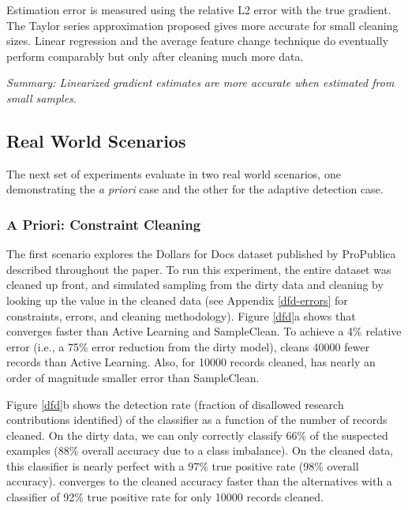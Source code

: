 Estimation error is measured using the relative L2 error with the true gradient.
The Taylor series approximation proposed gives more accurate for small cleaning sizes.
Linear regression and the average feature change technique do eventually perform comparably but only after cleaning much more data.

\vspace{0.25em}

\noindent \emph{Summary: Linearized gradient estimates are more accurate when estimated from small samples. }

\subsection{Real World Scenarios}
The next set of experiments evaluate \sys in two real world scenarios, one demonstrating the \emph{a priori} case and the other for the adaptive detection case.

\subsubsection{A Priori: Constraint Cleaning}\label{dfd-exp}
The first scenario explores the Dollars for Docs dataset published by ProPublica described throughout the paper.
To run this experiment, the entire dataset was cleaned up front, and simulated sampling from the dirty data and cleaning by looking up the value in the cleaned data (see Appendix \ref{dfd-errors} for constraints, errors, and cleaning methodology).
Figure \ref{dfd}a shows that \sys converges faster than Active Learning and SampleClean.
To achieve a 4\% relative error (i.e., a 75\% error reduction from the dirty model), \sys cleans 40000 fewer records than Active Learning.
Also, for 10000 records cleaned, \sys has nearly an order of magnitude smaller error than SampleClean.

Figure \ref{dfd}b shows the detection rate (fraction of disallowed research contributions identified) of the classifier as a function of the number of records cleaned. 
On the dirty data, we can only correctly classify 66\% of the suspected examples (88\% overall accuracy due to a class imbalance).
On the cleaned data, this classifier is nearly perfect with a 97\% true positive rate (98\% overall accuracy).
\sys converges to the cleaned accuracy faster than the alternatives with a classifier of 92\% true positive rate for only 10000 records cleaned.

\vspace{0.25em}

